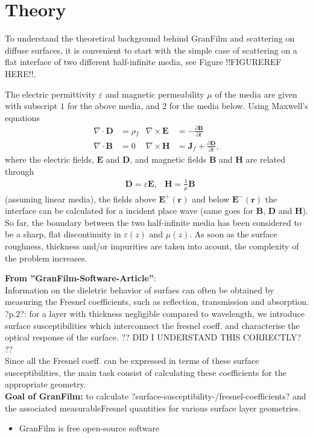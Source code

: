 \section{Theory}
To understand the theoretical background behind GranFilm and scattering on diffuse surfaces, it is 
convenient to start with the simple case of scattering on a flat interface of two different half-infinite
media, see Figure !!FIGUREREF HERE!!.

The electric permittivity $\varepsilon$ and magnetic permeability $\mu$ of the media are given with subscript $1$ for the above media, and $2$ for the media below. 
Using Maxwell's equations
%
\begin{subequations}
\label{ME}
\begin{align}
   \nabla \cdot \boldsymbol{D} &= \rho \!_f           &\nabla\times\boldsymbol{E} &= - \frac{\partial \boldsymbol{B}}{\partial t} \label{ME1}\\
   \nabla \cdot \boldsymbol{B} &= 0                &\nabla \times \boldsymbol{H}&= \boldsymbol{J}\!_f + \frac{\partial \boldsymbol{D}}{\partial t}, \label{ME2}
\end{align}
\end{subequations}
%
where the electric fields, $\boldsymbol{E}$ and $\boldsymbol{D}$, and magnetic fields $\boldsymbol{B}$ and $\boldsymbol{H}$ are related through
\begin{align}
   &\boldsymbol{D} = \varepsilon \boldsymbol{E},         &\boldsymbol{H} = \frac{1}{\mu} \boldsymbol{B}
\end{align}
(assuming linear media), the fields above $\boldsymbol{E}^+(\boldsymbol{r})$ and below $\boldsymbol{E}^-(\boldsymbol{r})$ the interface can be calculated for a incident place wave 
(same goes for $\boldsymbol{B}$, $\boldsymbol{D}$ and $\boldsymbol{H}$).
So far, the boundary between the two half-infinite media has been considered to be a sharp, flat discontinuity in $\varepsilon(z)$ and $\mu (z)$. 
As soon as the surface roughness, thickness and/or impurities are taken into acount, the complexity of the problem increases.


\textbf{From ''GranFilm-Software-Article''}: \\
Information on the dieletric behavior of surfaes can often be obtained by measuring the Fresnel coefficients,
such as reflection, transmission and absorption. \\
?p.2?: for a layer with thickness negligible compared to wavelength, we introduce surface susceptibilities 
which interconnect the  fresnel coeff. and characterise the optical response of the surface. ?? DID I UNDERSTAND THIS CORRECTLY? ?? \\
Since all the Fresnel coeff. can be expressed in terms of these surface susceptibilities, the main task consist of calculating these coefficients for the appropriate geometry. \\
\textbf{Goal of GranFilm:} to calculate ?surface-susceptibility-/fresnel-coefficients? and the associated measurableFresnel quantities for various surface layer geometries. 
\begin{itemize}
\item GranFilm is free open-source software
\end{itemize}
